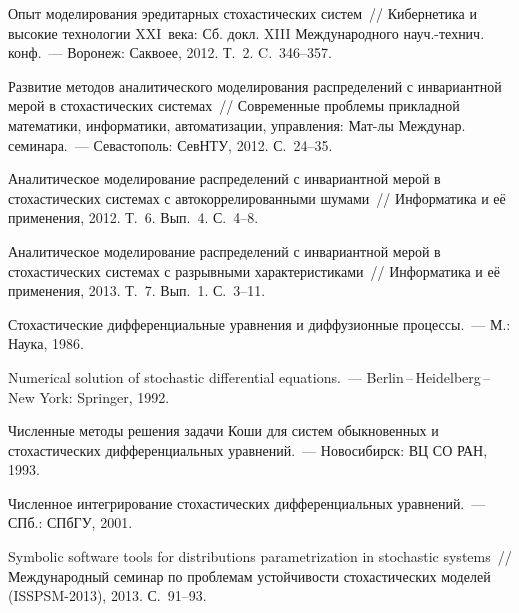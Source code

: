 \begin{multicols}{2}
{{\begin{thebibliography}{99}
Опыт моделирования эредитарных стохастических систем~// Кибернетика и высокие технологии XXI~века: Сб. докл.  
XIII Международного науч.-технич. конф.~--- Воронеж: Саквоее, 2012. Т.~2. C.~346--357.

  
Развитие методов аналитического моделирования распределений с инвариантной мерой в стохастических сис\-те\-мах~// 
Современные проблемы прикладной математики, информатики, автоматизации, управления: Мат-лы Междунар. семинара.~--- 
Севастополь:  СевНТУ, 2012. С.~24--35.

  Аналитическое моделирование распределений с инвариантной мерой в стохастических 
сис\-те\-мах с автокоррелированными шумами~// Информатика и её применения, 2012. Т.~6. Вып.~4. С.~4--8.

 
Аналитическое моделирование распределений с инвариантной мерой в
стохастических системах с разрывными характеристиками~// Информатика
и её применения, 2013. Т.~7. Вып.~1.  С.~3--11.

  Стохастические дифференциальные уравнения и диффузионные процессы.~--- М.: Наука, 1986.

\columnbreak

  Numerical solution of stochastic differential equations.~--- 
Berlin\,--\,Heidelberg\,--\,New York: Springer, 1992.

  Численные методы решения задачи Коши для сис\-тем обыкновенных и 
стохастических дифференциальных уравнений.~--- Новосибирск: ВЦ СО РАН, 1993.

  Численное интегрирование стохастических дифференциальных уравнений.~--- СПб.: СПбГУ, 2001.

\label{end\stat}

Symbolic software tools for distributions parametrization in stochastic systems~// Международный
семинар по проблемам устойчивости стохастических моделей (ISSPSM-2013), 2013. С.~91--93.

\end{thebibliography}
}
}

\end{multicols}